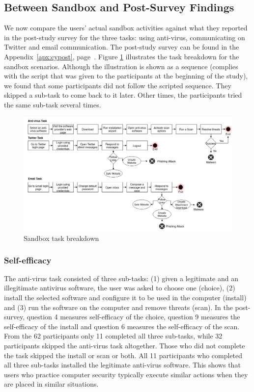 \subsection{Between Sandbox and Post-Survey Findings}
We now compare the users' actual sandbox activities against what they reported in the post-study survey for the three tasks: using anti-virus, communicating on Twitter and email communication. 
The post-study survey can be found in the Appendix~\ref{apx:cypost}, page~\pageref{apx:cypost}.
Figure \ref{fig:tasks} illustrates the task breakdown for the sandbox scenarios. 
Although the illustration is shown as a sequence (complies with the script that was given to the participants at the beginning of the study), we found that some participants did not follow the scripted sequence. 
They skipped a sub-task to come back to it later. Other times, the participants tried the same sub-task several times.

\begin{figure}[tbp]
  \centering
\includegraphics[width=1.1\columnwidth, keepaspectratio=true]{img/tasks.png}
  \caption{Sandbox task breakdown}
  \label{fig:tasks}
\end{figure}

\subsubsection{Self-efficacy}
The anti-virus task consisted of three sub-tasks: (1) given a legitimate and an illegitimate antivirus software, the user was asked to choose one (choice), (2) install the selected software and configure it to be used in the computer (install) and (3) run the software on the computer and remove threats (scan). In the post-survey, question 4 measures self-efficacy of the choice, question 9 measures the self-efficacy of the install and question 6 measures the self-efficacy of the scan. From the 62 participants only 11 completed all three sub-tasks, while 32 participants skipped the anti-virus task altogether. Those who did not complete the task skipped the install or scan or both. All 11 participants who completed all three sub-tasks installed the legitimate anti-virus software. This shows that users who practice computer security typically execute similar actions when they are placed in similar situations.

